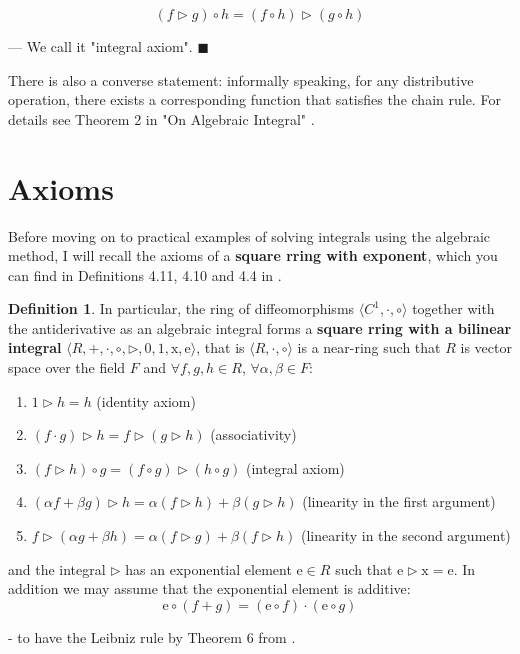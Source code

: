 \documentclass[12pt]{article}
\theoremstyle{definition}
\newtheorem*{definitionstar}{Definition}
\begin{document}
\[
(f \triangleright g) \circ h = (f \circ h) \triangleright (g \circ h) 
\]

\vspace{5pt}
\centerline{ --- We call it "integral axiom". $\blacksquare$}

\vspace{10pt}
\noindent There is also a converse statement: informally speaking, for any distributive operation, 
there exists a corresponding function that satisfies the chain rule. 
For details see Theorem 2 in "On Algebraic Integral" \cite{umerov2025}.

\newpage
\section*{Axioms}

\noindent Before moving on to practical examples of solving integrals using the algebraic method, 
I will recall the axioms of a \textbf{square rring with exponent}, which you can find in 
Definitions 4.11, 4.10 and 4.4 in \cite{umerov2025}. 


\begin{definitionstar}
In particular, the ring of diffeomorphisms $\langle C^1, \cdot, \circ \rangle$ together with the antiderivative 
as an algebraic integral forms a \textbf{square rring with a bilinear integral} 
$\langle R, +, \cdot, \circ, \triangleright, 0, 1, \mathrm{x}, \mathrm{e} \rangle$, 
that is $\langle R, \cdot, \circ \rangle$ is a near-ring such that $R$ is vector 
space over the field $F$ and $\forall f, g, h \in R$, $\forall \alpha, \beta \in F$:

\begin{enumerate}
\item $1 \triangleright h = h$ \hfill (identity axiom)  
\item $(f \cdot g) \triangleright h = f \triangleright (g \triangleright h)$ \hfill (associativity)  
\item $(f \triangleright h) \circ g = (f \circ g) \triangleright (h \circ g)$ \hfill (integral axiom)  
\item $(\alpha f + \beta g) \triangleright h = \alpha (f \triangleright h) + \beta (g \triangleright h)$ \hfill (linearity in the first argument)
\item $f \triangleright (\alpha g + \beta h) = \alpha (f \triangleright g) + \beta (f \triangleright h)$ \hfill (linearity in the second argument)
\end{enumerate}

and the integral $\triangleright$ has an exponential element 
$\mathrm{e} \in R$ such that $\mathrm{e} \triangleright \mathrm{x} = \mathrm{e}$. 
In addition we may assume that the exponential element is additive: 
\[
\mathrm{e} \circ (f+g)=(\mathrm{e} \circ f)\cdot(\mathrm{e} \circ g)
\]

- to have the Leibniz rule by Theorem 6 from \cite{umerov2025}.
\end{definitionstar}
\end{document}
